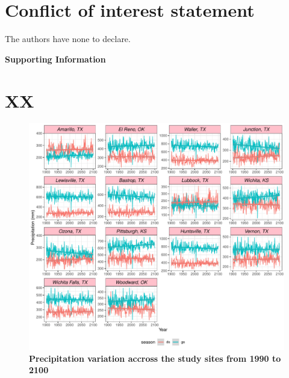 \documentclass[12pt]{article}
\begin{document}
\section*{Conflict of interest statement}
The authors have none to declare. 

\newpage


\newpage
\clearpage 
\setcounter{equation}{0}
\setcounter{figure}{0}
\setcounter{section}{0}
\setcounter{table}{0}
\renewcommand{\theequation}{S.\arabic{equation}}
\renewcommand{\thetable}{S-\arabic{table}}
\renewcommand{\thefigure}{S-\arabic{figure}}
\renewcommand{\thesection}{S.\arabic{section}}

\centerline{\Large{\textbf{Supporting Information}}}

\section {XX}	

\begin{figure}[H]
		\centering
		\includegraphics[width=0.95\linewidth]{Figures/fig_pr_past_present_future.pdf}
		\caption{\textbf{Precipitation variation accross the study sites from 1990 to 2100}}
		\label{Sup:pr_variation}
\end{figure}
\end{document}
